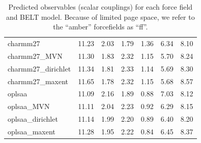 \documentclass[12pt]{article}
\begin{document}
\begin{table}
\begin{tabular}{lrrrrrr}
\toprule
charmm27                    &    11.23 &          2.03 &      1.79 &          1.36 &      6.34 &     8.10 \\
charmm27\_MVN                &    11.30 &          1.83 &      2.32 &          1.15 &      5.70 &     8.24 \\
charmm27\_dirichlet          &    11.34 &          1.81 &      2.33 &          1.14 &      5.69 &     8.30 \\
charmm27\_maxent             &    11.65 &          1.78 &      2.32 &          1.15 &      5.68 &     8.57 \\
\toprule
oplsaa                      &    11.09 &          2.16 &      1.89 &          0.88 &      7.03 &     8.12 \\
oplsaa\_MVN                  &    11.11 &          2.04 &      2.23 &          0.92 &      6.29 &     8.15 \\
oplsaa\_dirichlet            &    11.14 &          1.99 &      2.20 &          0.89 &      6.40 &     8.20 \\
oplsaa\_maxent               &    11.28 &          1.95 &      2.22 &          0.84 &      6.45 &     8.37 \\
\bottomrule

\end{tabular}
\caption{
Predicted observables (scalar couplings) for each force field and BELT model.  Because of limited page space, we refer to the ``amber'' forcefields as ``ff''.  
}
\end{table}



\clearpage
\end{document}
